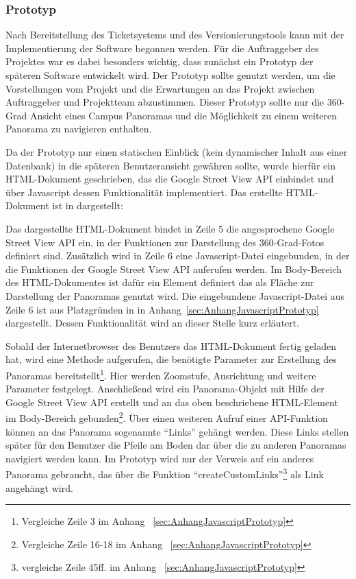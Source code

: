 \subsubsection{Prototyp}
\label{sec:Prototyp}

Nach Bereitstellung des Ticketsystems und des Versionierungstools kann mit der Implementierung der Software begonnen werden. Für die Auftraggeber des Projektes war es dabei besonders wichtig, dass zunächst ein Prototyp der späteren Software entwickelt wird. Der Prototyp sollte genutzt werden, um die Vorstellungen vom Projekt und die Erwartungen an das Projekt zwischen Auftraggeber und Projektteam abzustimmen.
Dieser Prototyp sollte nur die 360-Grad Ansicht eines Campus Panoramas und die Möglichkeit zu einem weiteren Panorama zu navigieren enthalten.

Da der Prototyp nur einen statischen Einblick (kein dynamischer Inhalt aus einer Datenbank) in die späteren Benutzeransicht gewähren sollte, wurde hierfür ein HTML-Dokument geschrieben, das die Google Street View API einbindet und über Javascript dessen Funktionalität implementiert. Das erstellte HTML-Dokument ist in  dargestellt:



Das dargestellte HTML-Dokument bindet in Zeile 5 die angesprochene Google Street View API ein, in der Funktionen zur Darstellung des 360-Grad-Fotos definiert sind. Zusätzlich wird in Zeile 6 eine Javascript-Datei eingebunden, in der die Funktionen der Google Street View API auferufen werden. Im Body-Bereich des HTML-Dokumentes ist dafür ein Element definiert das als Fläche zur Darstellung der Panoramas genutzt wird. Die eingebundene Javascript-Datei aus Zeile 6 ist aus Platzgründen in  in Anhang~\ref{sec:AnhangJavascriptPrototyp} dargestellt. Dessen Funktionalität wird an dieser Stelle kurz erläutert.

Sobald der Internetbrowser des Benutzers das HTML-Dokument fertig geladen hat, wird eine Methode aufgerufen, die benötigte Parameter zur Erstellung des Panoramas bereitstellt\footnote{Vergleiche Zeile 3 im Anhang ~\ref{sec:AnhangJavascriptPrototyp}}. Hier werden Zoomstufe, Ausrichtung und weitere Parameter festgelegt. Anschließend wird ein Panorama-Objekt mit Hilfe der Google Street View API erstellt und an das oben beschriebene HTML-Element im Body-Bereich gebunden\footnote{Vergleiche Zeile 16-18 im Anhang ~\ref{sec:AnhangJavascriptPrototyp}}. Über einen weiteren Aufruf einer API-Funktion können an das Panorama sogenannte "`Links"' gehängt werden. Diese Links stellen später für den Benutzer die Pfeile am Boden dar über die zu anderen Panoramas navigiert werden kann. Im Prototyp wird nur der Verweis auf ein anderes Panorama gebraucht, das über die Funktion "`createCustomLinks"'\footnote{vergleiche Zeile 45ff. im Anhang ~\ref{sec:AnhangJavascriptPrototyp}} als Link angehängt wird.

